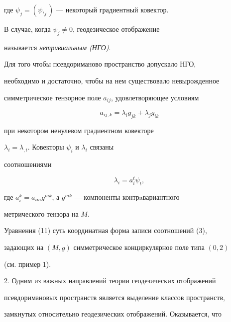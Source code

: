 где $\psi_{j}=(\psi,_{j})$ --- некоторый градиентный ковектор.


В случае, когда $\psi_{j}\neq 0$, геодезическое отображение 


называется {\it нетривиальным (НГО)}.


\medskip





Для того чтобы псевдориманово пространство допускало НГО, 


необходимо и достаточно, чтобы на нем существовало невырожденное 


симметрическое тензорное поле $a_{ij}$, удовлетворяющее условиям


\begin{equation}


a_{ij,k} = \lambda_{i} g_{jk} + \lambda_{j} g_{ik}


\end{equation}


при некотором ненулевом градиентном ковекторе


$\lambda_{i}=\lambda_{,i}$. Ковекторы $\psi_i$ и $\lambda_i$ связаны 


соотношениями


\begin{equation}


\lambda_i=a_i^t \psi_t,


\end{equation}


где $a_i^k= a_{im}g^{mk}$, а $g^{mk}$ --- компоненты контрaвариантного 


метрического тензора на $M$.





\begin{note}


Уравнения (11) суть координатная форма записи соотношений (3), 


задающих на $(M, g)$ симметрическое конциркулярное поле типа $(0, 2)$


(см. пример 1).


\end{note}





2. Одним из важных направлений теории геодезических отображений 


псевдоримановых пространств является выделение классов пространств, 


замкнутых относительно геодезических отображений. Оказывается, что 


